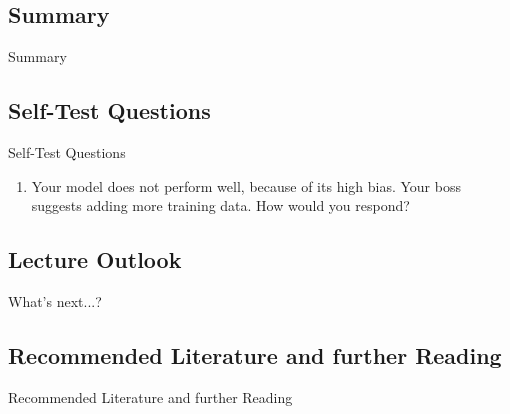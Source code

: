 \subsection{Summary}

\begin{frame}{Summary}{}

\end{frame}


\subsection{Self-Test Questions}

\begin{frame}{Self-Test Questions}{}\important
	\begin{enumerate}
		\item Your model does not perform well, because of its high bias.
			Your boss suggests adding more training data. How would you respond?
	\end{enumerate}
\end{frame}


\subsection{Lecture Outlook}

\begin{frame}{What's next...?}{}
\end{frame}


\subsection{Recommended Literature and further Reading}

\begin{frame}{Recommended Literature and further Reading}{}
	\footnotesize
	\begin{thebibliography}{2}

	\end{thebibliography}
\end{frame}


\makethanks


